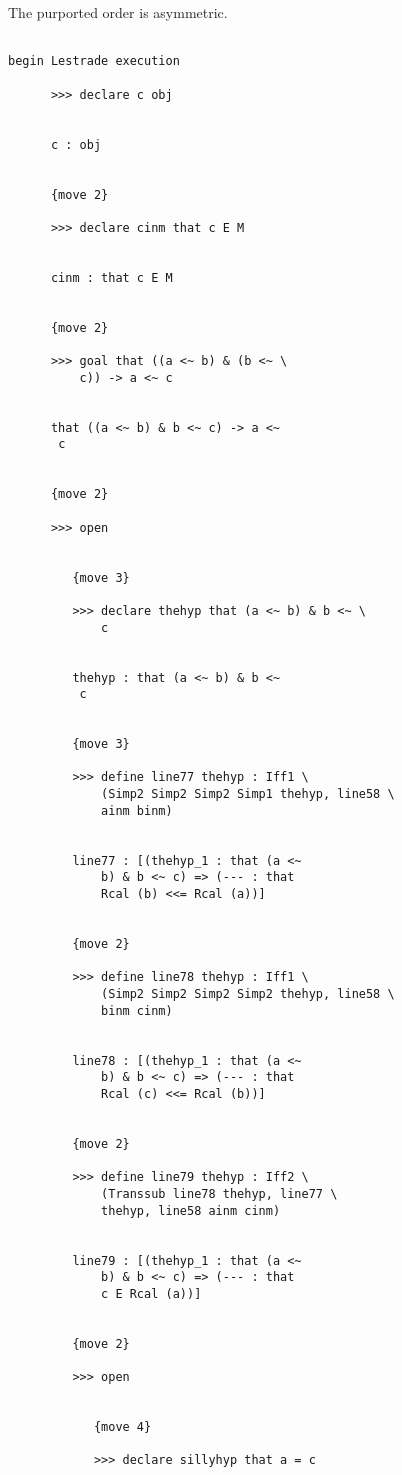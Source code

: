 \documentclass[12pt]{article}
\begin{document}
The purported order is asymmetric.

\begin{verbatim}

begin Lestrade execution

      >>> declare c obj


      c : obj


      {move 2}

      >>> declare cinm that c E M


      cinm : that c E M


      {move 2}

      >>> goal that ((a <~ b) & (b <~ \
          c)) -> a <~ c


      that ((a <~ b) & b <~ c) -> a <~ 
       c


      {move 2}

      >>> open


         {move 3}

         >>> declare thehyp that (a <~ b) & b <~ \
             c


         thehyp : that (a <~ b) & b <~ 
          c


         {move 3}

         >>> define line77 thehyp : Iff1 \
             (Simp2 Simp2 Simp2 Simp1 thehyp, line58 \
             ainm binm)


         line77 : [(thehyp_1 : that (a <~ 
             b) & b <~ c) => (--- : that 
             Rcal (b) <<= Rcal (a))]


         {move 2}

         >>> define line78 thehyp : Iff1 \
             (Simp2 Simp2 Simp2 Simp2 thehyp, line58 \
             binm cinm)


         line78 : [(thehyp_1 : that (a <~ 
             b) & b <~ c) => (--- : that 
             Rcal (c) <<= Rcal (b))]


         {move 2}

         >>> define line79 thehyp : Iff2 \
             (Transsub line78 thehyp, line77 \
             thehyp, line58 ainm cinm)


         line79 : [(thehyp_1 : that (a <~ 
             b) & b <~ c) => (--- : that 
             c E Rcal (a))]


         {move 2}

         >>> open


            {move 4}

            >>> declare sillyhyp that a = c



\end{verbatim}
\end{document}
